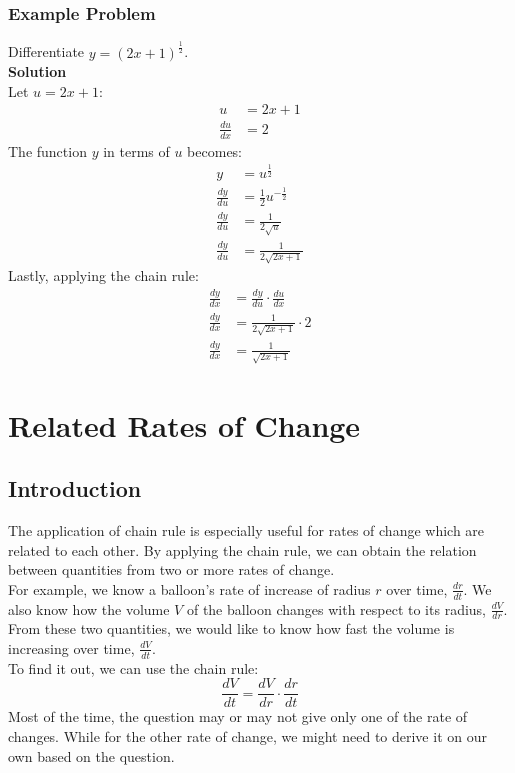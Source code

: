 \documentclass[hidelinks, a4paper, 12pt]{article}
\newcommand{\bd}{\textbf}
\newcommand{\n}{\\[\baselineskip]}
\newcommand{\dydx}{\frac{dy}{dx}}
\newcommand{\dudx}{\frac{du}{dx}}
\newcommand{\dydu}{\frac{dy}{du}}
\begin{document}
            \subsubsection{Example Problem}
                Differentiate $y = (2x+1)^{\frac{1}{2}}$.\n
                \bd{Solution}\n
                Let $u = 2x+1$:
                \[\begin{split}
                    u &= 2x + 1\\
                    \dudx &= 2
                \end{split}\]
                The function $y$ in terms of $u$ becomes:
                \[\begin{split}
                    y &= u^{\frac{1}{2}}\\
                    \dydu &= \frac{1}{2}u^{-\frac{1}{2}}\\
                    \dydu &= \frac{1}{2\sqrt{u}}\\
                    \dydu &= \frac{1}{2\sqrt{2x+1}}
                \end{split}\]
                Lastly, applying the chain rule:
                \[\begin{split}
                    \dydx &= \dydu \cdot \dudx\\
                    \dydx &= \frac{1}{2\sqrt{2x+1}} \cdot 2\\
                    \dydx &= \frac{1}{\sqrt{2x+1}}
                \end{split}\]
    
    \section{Related Rates of Change}
        \subsection{Introduction}
            The application of chain rule is especially useful for rates of change which are related to each other.
            By applying the chain rule, we can obtain the relation between quantities from two or more rates of change.\n
            For example, we know a balloon's rate of increase of radius $r$ over time, $\frac{dr}{dt}$. We also know how the volume $V$ of the balloon
            changes with respect to its radius, $\frac{dV}{dr}$. From these two quantities, we would like to know how fast the volume is increasing over time, $\frac{dV}{dt}$.\n
            To find it out, we can use the chain rule:
            \[\frac{dV}{dt} = \frac{dV}{dr}\cdot \frac{dr}{dt}\]
            Most of the time, the question may or may not give only one of the rate of changes. While for the other rate of change, we might need to derive it on our own based on the question.
\end{document}
